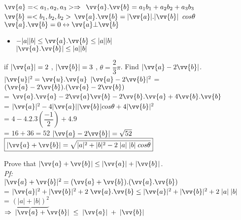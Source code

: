 $\vv{a} =<a_1,a_2,a_3>\Rightarrow\\$
$ \vv{a} . \vv{b} = a_1b_1 + a_2b_2 + a_3b_3$ \\
$\vv{b} =<b_1 , b_2 , b_2>$ \hspace{1.1cm} $\vv{a} . \vv{b} = |\vv{a}| . |\vv{b}| \; \; cos\theta$
\hspace*{3.5cm} $\vv{a} . \vv{b} = 0 \leftrightarrow  \vv{a} \bot \vv{b}$
\begin{itemize}
\item  $-|a||b| \leq \vv{a} . \vv{b} \leq |a| |b|$\\
\hspace*{1.4cm} $| \vv{a} . \vv{b}| \leq |a| |b|$
\end{itemize}
\noindent{\color{smalt(darkpowderblue)}\rule{\linewidth}{.2mm}}
\begin{example}
if $|\vv{a}| = 2$ , $|\vv{b}| = 3$ , $\theta = \dfrac{2}{3} \pi$. Find $|\vv{a} - 2 \vv{b}|$. 
$|\vv{u}|^2 = \vv{u} . \vv{u}$ \hspace{3cm}
$|\vv{a} - 2 \vv{b}|^2$  = $(\vv{a} - 2 \vv{b}) . (\vv{a} -2 \vv{b})$\\
\hspace*{7.1cm}    = $\vv{a} . \vv{a} - 2 \vv{a}
\vv{b} - 2 \vv{b} . \vv{a} + 4 \vv{b} . \vv{b}$\\
\hspace*{7.1cm}           = $|\vv{a}|^2 - 4 |\vv{a}| |\vv{b}| cos\theta + 4|\vv{b}|^2$\\
\hspace*{7.1cm}            = $4 - 4 . 2 .3 \left(\dfrac{-1}{2}\right) + 4.9$\\
\hspace*{7.1cm}           = $16 + 36 = 52$ 
$|\vv{a} - 2\vv{b}| = \sqrt{52}$\\
$\boxed{|\vv{a} + \vv{b}| = \sqrt{|a|^2 + |b|^2 -2 \; |a| \; |b| \; cos\theta}}$
\end{example}
\noindent{\color{smalt(darkpowderblue)}\rule{\linewidth}{.2mm}}
\begin{example}
Prove that $|\vv{a}  + \vv{b}| \leq |\vv{a}| + |\vv{b}| $.\\
\hspace*{1cm} \emph{Pf:}\\
$|\vv{a} + \vv{b}|^2 = (\vv{a} + \vv{b}) . (\vv{a} . \vv{b})$\\
\hspace*{1.35cm} = $|\vv{a}|^2 + |\vv{b}|^2 + 2 \; \vv{a} . \vv{b} \leq |\vv{a}|^2 + |\vv{b}|^2 + 2 \; |a| \; |b|$\\
\hspace*{4.95cm} = $\underbrace{(|a| + |b| )^2}$\\
$\Rightarrow \; |\vv{a} + \vv{b}| \; \leq \; |\vv{a}| \; + \; |\vv{b}|$

\end{example}
